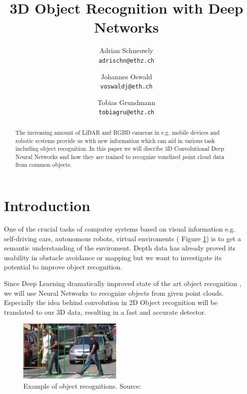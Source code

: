 \documentclass[10pt,twocolumn,letterpaper]{article}
\begin{document}
\title{3D Object Recognition with Deep Networks}

\author{Adrian Schneuwly\\
{\tt\small adrischn@ethz.ch}
\and
Johannes Oswald\\
{\tt\small voswaldj@eth.ch}
\and
Tobias Grundmann\\
{\tt\small tobiagru@ethz.ch}
}

\maketitle

\begin{abstract}
   The increasing amount of LiDAR and RGBD cameras in e.g. mobile devices
   and robotic systems provide us with new information which can aid in various task including object recognition. In this paper we will discribe 3D Convolutional Deep Neural Networks and  how they are trained to recognize voxelized point cloud data from common objects.
\end{abstract}

\section{Introduction}

One of the crucial tasks of computer systems based on visual information e.g. self-driving cars, autonomous robots, virtual enviroments ( Figure \ref{fig:obj_rec}) is to get a semantic understanding of the enviroment. Depth data has already proved its usability in obstacle avoidance or mapping but we want to investigate its potential to improve object recognition.


Since Deep Learning dramatically improved state of the art object recognition \cite{cnn}, we will use Neural Networks to recognize objects from given point clouds. Especially the idea behind convolution in 2D Object recognition will be translated to our 3D data, resulting in a fast and accurate detector. 

\begin{figure}[h]
	\label{fig:obj_rec}
	\centering
	\includegraphics[width=0.45\textwidth]{obj_rec}
	\caption{Example of object recognitions. Source: \cite{udacity}}
\end{figure}
\end{document}
